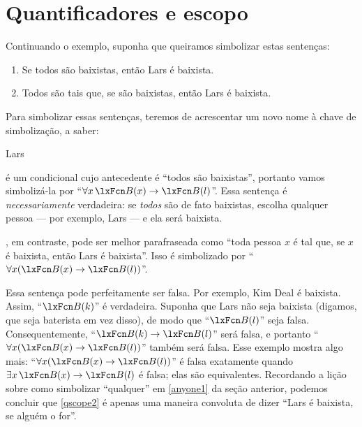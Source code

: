 \section{Quantificadores e escopo}
Continuando o exemplo, suponha que queiramos simbolizar estas sentenças:
	\begin{enumerate}
\item\label{qscope1} Se todos são baixistas, então Lars é baixista.
\item\label{qscope2} Todos são tais que, se são baixistas, então Lars é baixista.
	\end{enumerate}
Para simbolizar essas sentenças, teremos de acrescentar um novo nome à chave de simbolização, a saber:
	\begin{ekey}
		\item[l] Lars
	\end{ekey}
 é um condicional cujo antecedente é \textquotedblleft todos são baixistas\textquotedblright{}, portanto vamos simbolizá-la por \textquotedblleft $\forall x\, \atom{B}{x} \eif \atom{B}{l}$\textquotedblright{}. Essa sentença é \emph{necessariamente} verdadeira: se \emph{todos} são de fato baixistas, escolha qualquer pessoa — por exemplo, Lars — e ela será baixista.

, em contraste, pode ser melhor parafraseada como \textquotedblleft toda pessoa $x$ é tal que, se $x$ é baixista, então Lars é baixista\textquotedblright{}.
Isso é simbolizado por \textquotedblleft $\forall x (\atom{B}{x} \eif \atom{B}{l})$\textquotedblright{}.

Essa sentença pode perfeitamente ser falsa. Por exemplo, Kim Deal é baixista.
Assim, \textquotedblleft $\atom{B}{k}$\textquotedblright{} é verdadeira. Suponha que Lars não seja baixista (digamos, que seja baterista em vez disso), de modo que \textquotedblleft $\atom{B}{l}$\textquotedblright{} seja falsa.
Consequentemente, \textquotedblleft $\atom{B}{k} \eif \atom{B}{l}$\textquotedblright{} será falsa, e portanto \textquotedblleft $\forall x
(\atom{B}{x} \eif \atom{B}{l})$\textquotedblright{} também será falsa. Esse exemplo
mostra algo mais: \textquotedblleft $\forall x (\atom{B}{x} \eif \atom{B}{l})$\textquotedblright{} é
falsa exatamente quando $\exists x\,\atom{B}{x} \eif \atom{B}{l}$ é falsa;
elas são equivalentes. Recordando a lição sobre como simbolizar \textquotedblleft qualquer\textquotedblright{}
em \cref{anyone1} da seção anterior, podemos concluir que
\cref*{qscope2} é apenas uma maneira convoluta de dizer \textquotedblleft Lars é baixista,
se alguém o for\textquotedblright{}.


